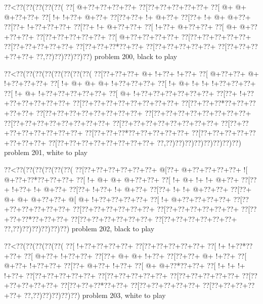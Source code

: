\vbox{\vbox{\goo
\0??<\0??(\0??(\0??(\0??(\0??(
\0??[\- @+\0??+\0??+\0??+\0??+
\0??[\0??+\0??+\0??+\0??+\0??+
\0??[\- @+\- @+\- @+\0??+\0??+
\0??[\- !+\- !+\0??+\- @+\0??+
\0??[\0??+\0??+\- !+\- @+\0??+
\0??[\0??+\- !+\- @+\- @+\0??+
\0??[\0??+\- !+\0??+\0??+\0??+
\0??[\0??+\- !+\- @+\0??+\0??+
\0??[\- !+\0??+\- @+\0??+\0??+
\0??[\- @+\- @+\0??+\0??+\0??+
\0??[\0??+\0??+\0??+\0??+\0??+
\0??[\- @+\0??+\0??+\0??+\0??+
\0??[\0??+\0??+\0??+\0??+\0??+
\0??[\0??+\0??+\0??+\0??+\0??+
\0??[\0??+\0??+\0??*\0??+\0??+
\0??[\0??+\0??+\0??+\0??+\0??+
\0??[\0??+\0??+\0??+\0??+\0??+
\0??,\0??)\0??)\0??)\0??)\0??)
}
\hfil problem 200, black to play\hfil\break
}

\vbox{\vbox{\goo
\0??<\0??(\0??(\0??(\0??(\0??(\0??(\0??(\0??(
\0??[\0??+\0??+\0??+\- @+\- !+\0??+\- !+\0??+
\0??[\- @+\0??+\0??+\- @+\- !+\0??+\0??+\0??+
\0??[\- !+\- @+\- @+\- @+\- !+\0??+\0??+\0??+
\0??[\- !+\- @+\- !+\- !+\- !+\0??+\0??+\0??+
\0??[\- !+\- @+\- !+\0??+\0??+\0??+\0??+\0??+
\0??[\- @+\- !+\0??+\0??+\0??+\0??+\0??+\0??+
\0??[\0??+\- !+\0??+\0??+\0??+\0??+\0??+\0??+
\0??[\0??+\0??+\0??+\0??+\0??+\0??+\0??+\0??+
\0??[\0??+\0??+\0??*\0??+\0??+\0??+\0??+\0??+
\0??[\0??+\0??+\0??+\0??+\0??+\0??+\0??+\0??+
\0??[\0??+\0??+\0??+\0??+\0??+\0??+\0??+\0??+
\0??[\0??+\0??+\0??+\0??+\0??+\0??+\0??+\0??+
\0??[\0??+\0??+\0??+\0??+\0??+\0??+\0??+\0??+
\0??[\0??+\0??+\0??+\0??+\0??+\0??+\0??+\0??+
\0??[\0??+\0??+\0??*\0??+\0??+\0??+\0??+\0??+
\0??[\0??+\0??+\0??+\0??+\0??+\0??+\0??+\0??+
\0??[\0??+\0??+\0??+\0??+\0??+\0??+\0??+\0??+
\0??,\0??)\0??)\0??)\0??)\0??)\0??)\0??)\0??)
}
\hfil problem 201, white to play\hfil\break
}

\vbox{\vbox{\goo
\0??<\0??(\0??(\0??(\0??(\0??(\0??(
\0??[\0??+\0??+\0??+\0??+\0??+\0??+
\- @[\0??+\- @+\0??+\0??+\0??+\0??+
\- ![\- @+\0??+\0??*\0??+\0??+\0??+
\0??[\- !+\- @+\- @+\- @+\0??+\0??+
\0??[\- !+\- @+\- !+\- !+\- @+\0??+
\0??[\0??+\- !+\0??+\- !+\- @+\0??+
\0??[\0??+\- !+\0??+\- !+\- @+\0??+
\0??[\0??+\- !+\- !+\- @+\0??+\0??+
\0??[\0??+\- @+\- @+\- @+\0??+\0??+
\- @[\- @+\- !+\0??+\0??+\0??+\0??+
\0??[\- !+\- @+\0??+\0??+\0??+\0??+
\0??[\0??+\0??+\0??+\0??+\0??+\0??+
\0??[\0??+\0??+\0??+\0??+\0??+\0??+
\0??[\0??+\0??+\0??+\0??+\0??+\0??+
\0??[\0??+\0??+\0??*\0??+\0??+\0??+
\0??[\0??+\0??+\0??+\0??+\0??+\0??+
\0??[\0??+\0??+\0??+\0??+\0??+\0??+
\0??,\0??)\0??)\0??)\0??)\0??)\0??)
}
\hfil problem 202, black to play\hfil\break
}

\vbox{\vbox{\goo
\0??<\0??(\0??(\0??(\0??(\0??(
\0??[\- !+\0??+\0??+\0??+\0??+
\0??[\0??+\0??+\0??+\0??+\0??+
\0??[\- !+\- !+\0??*\0??+\0??+
\0??[\- @+\0??+\- !+\0??+\0??+
\0??[\0??+\- @+\- @+\- !+\0??+
\0??[\0??+\0??+\- @+\- !+\0??+
\0??[\- @+\0??+\- !+\0??+\0??+
\0??[\0??+\- @+\0??+\- !+\0??+
\0??[\- @+\- @+\0??*\0??+\0??+
\0??[\- !+\- !+\- !+\- !+\0??+
\0??[\0??+\0??+\0??+\0??+\0??+
\0??[\0??+\0??+\0??+\0??+\0??+
\0??[\0??+\0??+\0??+\0??+\0??+
\0??[\0??+\0??+\0??+\0??+\0??+
\0??[\0??+\0??+\0??*\0??+\0??+
\0??[\0??+\0??+\0??+\0??+\0??+
\0??[\0??+\0??+\0??+\0??+\0??+
\0??,\0??)\0??)\0??)\0??)\0??)
}
\hfil problem 203, white to play\hfil\break
}

